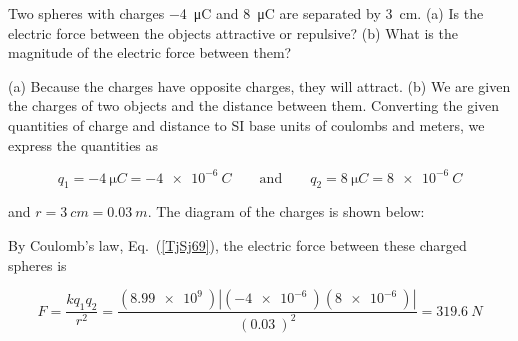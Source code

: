\documentclass[main.tex]{subfiles}
\begin{document}
\begin{example} \label{e3NF5s}
Two spheres with charges \SI{-4}{\micro C} and \SI{8}{\micro C} are separated by \SI{3}{cm}. (a) Is the electric force between the objects attractive or repulsive? (b) What is the magnitude of the electric force between them?
\end{example}

\Solution (a) Because the charges have opposite charges, they will attract. (b) We are given the charges of two objects and the distance between them. Converting the given quantities of charge and distance to SI base units of coulombs and meters, we express the quantities as

\begin{equation*}
    q_1 = \SI{-4}{\micro C} = \SI{-4e-6}{C} 
    \qquad \text{and} \qquad
    q_2 = \SI{8}{\micro C} = \SI{8e-6}{C}
\end{equation*}

and $r = \SI{3}{cm} = \SI{0.03}{m}$. The diagram of the charges is shown below:

\begin{center}
\end{center}

By Coulomb's law, Eq.~(\ref{TjSj69}), the electric force between these charged spheres is

\begin{equation*}
    F = \frac{k q_1 q_2}{r^2} = \frac{\left(\SI{8.99e9}{}\right) \left|\left(\SI{-4e-6}{}\right) \left(\SI{8e-6}{}\right)\right|}{\left(\SI{0.03}{}\right)^2} =
    \SI{319.6}{N}
\end{equation*}
\end{document}
